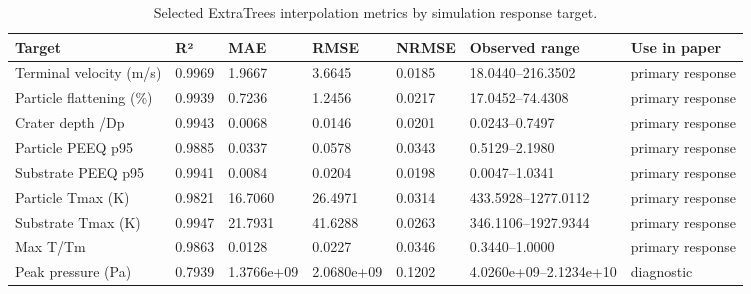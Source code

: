 \begin{table}[t]
\centering
\caption{Selected ExtraTrees interpolation metrics by simulation response target.}
\label{tab:target_metrics}
\begin{tabular}{lllllll}
\hline
Target & R² & MAE & RMSE & NRMSE & Observed range & Use in paper \\
\hline
Terminal velocity (m/s) & 0.9969 & 1.9667 & 3.6645 & 0.0185 & 18.0440–216.3502 & primary response \\
Particle flattening (\%) & 0.9939 & 0.7236 & 1.2456 & 0.0217 & 17.0452–74.4308 & primary response \\
Crater depth /Dp & 0.9943 & 0.0068 & 0.0146 & 0.0201 & 0.0243–0.7497 & primary response \\
Particle PEEQ p95 & 0.9885 & 0.0337 & 0.0578 & 0.0343 & 0.5129–2.1980 & primary response \\
Substrate PEEQ p95 & 0.9941 & 0.0084 & 0.0204 & 0.0198 & 0.0047–1.0341 & primary response \\
Particle Tmax (K) & 0.9821 & 16.7060 & 26.4971 & 0.0314 & 433.5928–1277.0112 & primary response \\
Substrate Tmax (K) & 0.9947 & 21.7931 & 41.6288 & 0.0263 & 346.1106–1927.9344 & primary response \\
Max T/Tm & 0.9863 & 0.0128 & 0.0227 & 0.0346 & 0.3440–1.0000 & primary response \\
Peak pressure (Pa) & 0.7939 & 1.3766e+09 & 2.0680e+09 & 0.1202 & 4.0260e+09–2.1234e+10 & diagnostic \\
\hline
\end{tabular}
\end{table}
